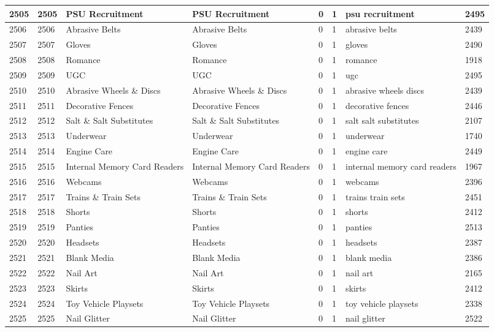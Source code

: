 \begin{longtable}{|l|l|l|l|l|l|l|l|}
2505 & 2505 & PSU Recruitment & PSU Recruitment & 0 & 1 & psu recruitment & 2495 \\ \hline 
2506 & 2506 & Abrasive Belts & Abrasive Belts & 0 & 1 & abrasive belts & 2439 \\ \hline 
2507 & 2507 & Gloves & Gloves & 0 & 1 & gloves & 2490 \\ \hline 
2508 & 2508 & Romance & Romance & 0 & 1 & romance & 1918 \\ \hline 
2509 & 2509 & UGC & UGC & 0 & 1 & ugc & 2495 \\ \hline 
2510 & 2510 & Abrasive Wheels \& Discs & Abrasive Wheels \& Discs & 0 & 1 & abrasive wheels discs & 2439 \\ \hline 
2511 & 2511 & Decorative Fences & Decorative Fences & 0 & 1 & decorative fences & 2446 \\ \hline 
2512 & 2512 & Salt \& Salt Substitutes & Salt \& Salt Substitutes & 0 & 1 & salt salt substitutes & 2107 \\ \hline 
2513 & 2513 & Underwear & Underwear & 0 & 1 & underwear & 1740 \\ \hline 
2514 & 2514 & Engine Care & Engine Care & 0 & 1 & engine care & 2449 \\ \hline 
2515 & 2515 & Internal Memory Card Readers & Internal Memory Card Readers & 0 & 1 & internal memory card readers & 1967 \\ \hline 
2516 & 2516 & Webcams & Webcams & 0 & 1 & webcams & 2396 \\ \hline 
2517 & 2517 & Trains \& Train Sets & Trains \& Train Sets & 0 & 1 & trains train sets & 2451 \\ \hline 
2518 & 2518 & Shorts & Shorts & 0 & 1 & shorts & 2412 \\ \hline 
2519 & 2519 & Panties & Panties & 0 & 1 & panties & 2513 \\ \hline 
2520 & 2520 & Headsets & Headsets & 0 & 1 & headsets & 2387 \\ \hline 
2521 & 2521 & Blank Media & Blank Media & 0 & 1 & blank media & 2386 \\ \hline 
2522 & 2522 & Nail Art & Nail Art & 0 & 1 & nail art & 2165 \\ \hline 
2523 & 2523 & Skirts & Skirts & 0 & 1 & skirts & 2412 \\ \hline 
2524 & 2524 & Toy Vehicle Playsets & Toy Vehicle Playsets & 0 & 1 & toy vehicle playsets & 2338 \\ \hline 
2525 & 2525 & Nail Glitter & Nail Glitter & 0 & 1 & nail glitter & 2522 \\ \hline 

\end{longtable}

